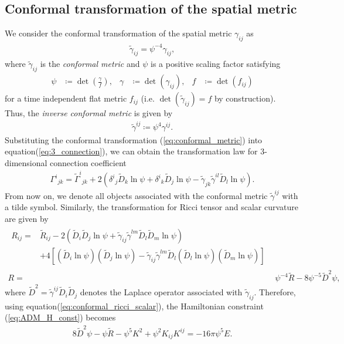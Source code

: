 \subsection{Conformal transformation of the spatial metric}
\label{section2.3.1}
We consider the conformal transformation of the spatial metric $\gamma_{ij}$ as
\begin{align}\label{eq:conformal_metric}
    \tilde{\gamma}_{ij} = \psi^{-4} \gamma_{ij},
\end{align}
where $\tilde{\gamma}_{ij}$ is the \textit{conformal metric} and $\psi$ is a positive scaling factor satisfying
\begin{align}\label{eq:scaling_factor}
    \psi &\coloneqq \det{\left( \frac{\gamma}{f} \right)}, & \gamma &\coloneqq \det{\left( \gamma_{ij} \right)}, & f &\coloneqq \det{\left( f_{ij} \right)}
\end{align}
for a time independent flat metric $f_{ij}$ (i.e. $\det{\left( \tilde{\gamma}_{ij} \right)} = f$ by construction).\\
Thus, the \textit{inverse conformal metric} is given by
\begin{align}\label{eq:conformal_metric_inv}
    \tilde{\gamma}^{ij} \coloneqq \psi^4 \gamma^{ij}.
\end{align}
Substituting the conformal transformation (\ref{eq:conformal_metric}) into equation(\ref{eq:3_connection}),
we can obtain the transformation law for 3-dimensional connection coefficient
\begin{align}
    \Gamma^{i}{}_{jk} = \tilde{\Gamma}^{i}{}_{jk} + 2 \left( \delta^i{}_j \tilde{D}_k \ln \psi + \delta^i{}_k \tilde{D}_j \ln \psi
    - \tilde{\gamma}_{jk} \tilde{\gamma}^{il} \tilde{D}_l \ln \psi \right).
\end{align}
From now on, we denote all objects associated with the conformal metric $\tilde{\gamma}^{ij}$ with a tilde symbol.
Similarly, the transformation for Ricci tensor and scalar curvature are given by
\begin{align}
\begin{split}
    R_{ij} =& \tilde{R}_{ij} - 2 \left( \tilde{D}_i \tilde{D}_j \ln \psi + \tilde{\gamma}_{ij} \tilde{\gamma}^{lm} \tilde{D}_l \tilde{D}_m \ln \psi \right)\\
    &+ 4 \left[ \left(\tilde{D}_i \ln \psi \right) \left( \tilde{D}_j \ln \psi \right) 
    - \tilde{\gamma}_{ij} \tilde{\gamma}^{lm} \tilde{D}_l \left(\tilde{D}_l \ln \psi \right) \left( \tilde{D}_m \ln \psi \right) \right]
\end{split} \label{eq:conformal_ricci_tensor}\\
    R =& \psi^{-4} \tilde{R} - 8 \psi^{-5} \tilde{D}^2 \psi, \label{eq:conformal_ricci_scalar}
\end{align}
where $\tilde{D}^2 = \tilde{\gamma}^{ij} \tilde{D}_i \tilde{D}_j$ denotes the Laplace operator associated with $\tilde{\gamma}_{ij}$.
Therefore, using equation(\ref{eq:conformal_ricci_scalar}), the Hamiltonian constraint (\ref{eq:ADM_H_const}) becomes
\begin{align}
    8 \tilde{D}^2 \psi - \psi \tilde{R} - \psi^5 K^2 + \psi^2 K_{ij} K^{ij} = - 16 \pi \psi^5 E.
\end{align}

